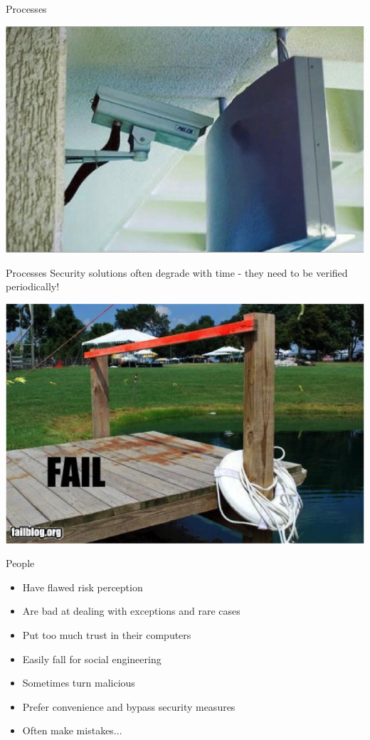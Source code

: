 \documentclass{beamer}
\begin{document}
\begin{frame}{Processes}
\begin{center}
\includegraphics[width=0.8\linewidth]{process1.png} 
\end{center}
\end{frame}

\begin{frame}{Processes}
Security solutions often degrade with time - they need to be verified periodically!
\begin{center}
\includegraphics[width=0.7\linewidth]{process2.png} 
\end{center}
\end{frame}

\begin{frame}{People}
	\begin{itemize}
		\item Have flawed risk perception
		\item Are bad at dealing with exceptions and rare cases
        \item Put too much trust in their computers
        \item Easily fall for social engineering
        \item Sometimes turn malicious
        \item Prefer convenience and bypass security measures
        \item Often make mistakes...
	\end{itemize}
\end{frame}
\end{document}

